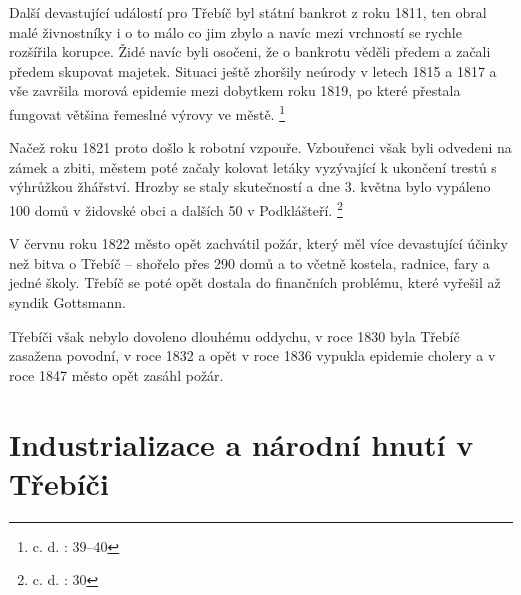 \documentclass[a4paper,oneside,12p]{report}
\begin{document}
Další devastující událostí pro Třebíč byl státní bankrot z roku 1811, ten obral malé živnostníky i o to málo co jim zbylo a navíc mezi vrchností se rychle rozšířila korupce.
Židé navíc byli osočeni, že o bankrotu věděli předem a začali předem skupovat majetek.
Situaci ještě zhoršily neúrody v letech 1815 a 1817 a vše završila morová epidemie mezi dobytkem roku 1819, po které přestala fungovat většina řemeslné výrovy ve městě. \footnote{c. d. : 39--40}

Načež roku 1821 proto došlo k robotní vzpouře.
Vzbouřenci však byli odvedeni na zámek a zbiti, městem poté začaly kolovat letáky vyzývající k ukončení trestů s výhrůžkou žhářství.
Hrozby se staly skutečností a dne 3. května bylo vypáleno 100 domů v židovské obci a dalších 50 v Podklášteří. \footnote{c. d. : 30}

V červnu roku 1822 město opět zachvátil požár, který měl více devastující účinky než bitva o Třebíč -- shořelo přes 290 domů a to včetně kostela, radnice, fary a jedné školy.
Třebíč se poté opět dostala do finančních problému, které vyřešil až syndik Gottsmann.

Třebíči však nebylo dovoleno dlouhému oddychu, v roce 1830 byla Třebíč zasažena povodní, v roce 1832 a opět v roce 1836 vypukla epidemie cholery a v roce 1847 město opět zasáhl požár.






\section{Industrializace a národní hnutí v Třebíči}
\end{document}
